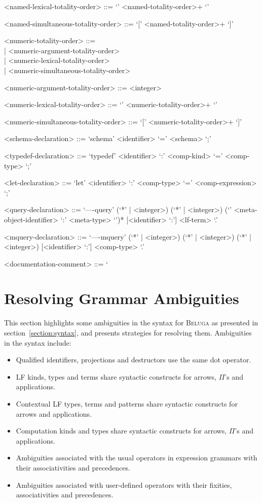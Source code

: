 \documentclass[11pt]{article}
\newcommand{\Beluga}{\textsc{Beluga}\xspace}
\newcommand{\LF}{\textsc{LF}\xspace}
\begin{document}
\begin{grammar}
<named-lexical-totality-order> ::= `{' <named-totality-order>+ `}'

<named-simultaneous-totality-order> ::= `[' <named-totality-order>+ `]'

<numeric-totality-order> ::= \hfill\\
| <numeric-argument-totality-order>\\
| <numeric-lexical-totality-order>\\
| <numeric-simultaneous-totality-order>

<numeric-argument-totality-order> ::= <integer>

<numeric-lexical-totality-order> ::= `{' <numeric-totality-order>+ `}'

<numeric-simultaneous-totality-order> ::= `[' <numeric-totality-order>+ `]'

<schema-declaration> ::= `schema' <identifier> `=' <schema> `;'

<typedef-declaration> ::= `typedef' <identifier> `:' <comp-kind> `=' <comp-type> `;'

<let-declaration> ::= `let' <identifier> `:' <comp-type> `=' <comp-expression> `;'

<query-declaration> ::= `----query' (`*' | <integer>) (`*' | <integer>) (`{' <meta-object-identifier> `:' <meta-type> `}')* [<identifier> `:'] <lf-term> `.'

<mquery-declaration> ::= `----mquery' (`*' | <integer>) (`*' | <integer>) (`*' | <integer>) [<identifier> `:'] <comp-type> `.'

<documentation-comment> ::= `%
\end{grammar}

\section{Resolving Grammar Ambiguities}\label{section:resolving-grammar-ambiguities}

This section highlights some ambiguities in the syntax for \Beluga as presented in section~\ref{section:syntax}, and presents strategies for resolving them.
Ambiguities in the syntax include:
\begin{itemize}
\item Qualified identifiers, projections and destructors use the same dot operator.
\item \LF kinds, types and terms share syntactic constructs for arrows, $ \Pi $'s and applications.
\item Contextual \LF types, terms and patterns share syntactic constructs for arrows and applications.
\item Computation kinds and types share syntactic constructs for arrows, $ \Pi $'s and applications.
\item Ambiguities associated with the usual operators in expression grammars with their associativities and precedences.
\item Ambiguities associated with user-defined operators with their fixities, associativities and precedences.
\end{itemize}
\end{document}
